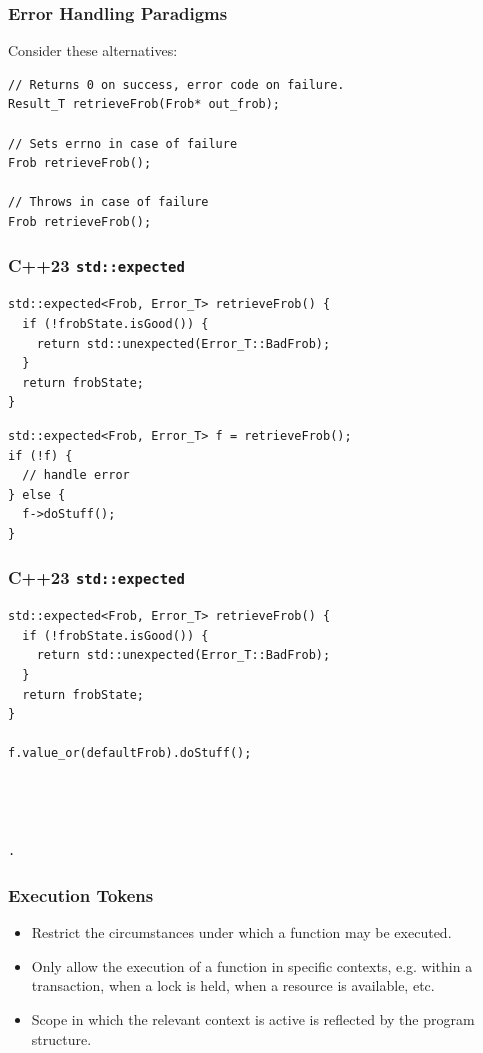 \documentclass[aspectratio=169]{beamer}
\newif\iftransitions
\newcommand{\cpause}{\iftransitions \pause \fi}
\begin{document}
\begin{frame}[fragile]
  \frametitle{Error Handling Paradigms}
  
Consider these alternatives:
  \begin{lstlisting}[style=cpp20]
// Returns 0 on success, error code on failure.
Result_T retrieveFrob(Frob* out_frob);

// Sets errno in case of failure
Frob retrieveFrob();

// Throws in case of failure
Frob retrieveFrob();
  \end{lstlisting}
\end{frame}

\begin{frame}[fragile]
  \frametitle{C++23 \texttt{std::expected}}
  
  \begin{lstlisting}[style=cpp20]
std::expected<Frob, Error_T> retrieveFrob() {
  if (!frobState.isGood()) {
    return std::unexpected(Error_T::BadFrob);
  }
  return frobState;
}
  \end{lstlisting}
  \cpause
  \begin{lstlisting}[style=cpp20]
std::expected<Frob, Error_T> f = retrieveFrob();
if (!f) {
  // handle error
} else {
  f->doStuff();
}
  \end{lstlisting}
\end{frame}

\begin{frame}[fragile]
  \frametitle{C++23 \texttt{std::expected}}
  
  \begin{lstlisting}[style=cpp20]
std::expected<Frob, Error_T> retrieveFrob() {
  if (!frobState.isGood()) {
    return std::unexpected(Error_T::BadFrob);
  }
  return frobState;
}

f.value_or(defaultFrob).doStuff();




.
  \end{lstlisting}
\end{frame}


\begin{frame}[fragile]
  \frametitle{Execution Tokens}
  
  \begin{itemize}
  \item Restrict the circumstances under which a function may be executed.
  \item Only allow the execution of a function in specific contexts, e.g. within a transaction, when a lock is held, when a resource is available, etc.
  \item Scope in which the relevant context is active is reflected by the program structure.
  \end{itemize}
\end{frame}
\end{document}

